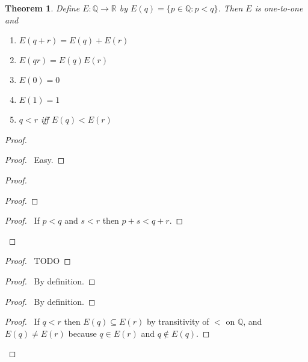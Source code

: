 \documentclass{article}
\let\qed\relax
\newtheorem{theorem}[axiom]{Theorem}
\theoremstyle{definition}
\begin{document}
    \begin{theorem}
        Define $E : \mathbb{Q} \rightarrow \mathbb{R}$ by $E(q) = \{ p \in \mathbb{Q} : p < q \}$.
        Then $E$ is one-to-one and
        \begin{enumerate}
            \item $E(q+r) = E(q) + E(r)$
            \item $E(qr) = E(q) E(r)$
            \item $E(0) = 0$
            \item $E(1) = 1$
            \item $q < r$ iff $E(q) < E(r)$
        \end{enumerate}
    \end{theorem}

    \begin{proof}
        \pf
        \begin{proof}
            \pf\ Easy.
        \end{proof}
        \begin{proof}
            \begin{proof}
            \end{proof}
            \begin{proof}
                \pf\ If $p < q$ and $s < r$ then $p+s < q+r$.
            \end{proof}
        \end{proof}
        \begin{proof}
            \pf\ TODO
        \end{proof}
        \begin{proof}
            \pf\ By definition.
        \end{proof}
        \begin{proof}
            \pf\ By definition.
        \end{proof}
        \begin{proof}
            \pf\ If $q < r$ then $E(q) \subseteq E(r)$ by transitivity of $<$ on $\mathbb{Q}$,
            and $E(q) \neq E(r)$ because $q \in E(r)$ and $q \notin E(q)$.
        \end{proof}
        \qed
    \end{proof}
\end{document}
